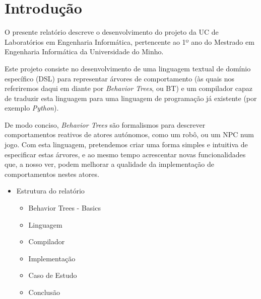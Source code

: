 
\chapter{Introdução} %

\label{Chapter1} %


\newcommand{\keyword}[1]{\textbf{#1}}
\newcommand{\tabhead}[1]{\textbf{#1}}
\newcommand{\code}[1]{\texttt{#1}}
\newcommand{\file}[1]{\texttt{\bfseries#1}}
\newcommand{\option}[1]{\texttt{\itshape#1}}


O presente relatório descreve o desenvolvimento do projeto da UC de Laboratórios em Engenharia Informática, pertencente ao 1º ano do Mestrado em Engenharia Informática da Universidade do Minho.

Este projeto consiste no desenvolvimento de uma linguagem textual de domínio específico (DSL) para representar árvores de comportamento (às quais nos referiremos daqui em diante por \textit{Behavior Trees}, ou BT) e um compilador capaz de traduzir esta linguagem para uma linguagem de programação já existente (por exemplo \textit{Python}).

De modo conciso, \textit{Behavior Trees} são formalismos para descrever comportamentos reativos de atores autónomos, como um robô, ou um NPC num jogo.
Com esta linguagem, pretendemos criar uma forma simples e intuitiva de especificar estas árvores, e ao mesmo tempo acrescentar novas funcionalidades que, a nosso ver, podem melhorar a qualidade da implementação de comportamentos nestes atores.


\begin{itemize}
    \item Estrutura do relatório
    \begin{itemize}
        \item Behavior Trees - Basics
        \item Linguagem
        \item Compilador
        \item Implementação
        \item Caso de Estudo
        \item Conclusão
    \end{itemize}

\end{itemize}

